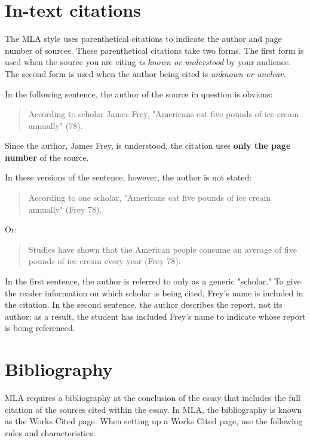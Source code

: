 \section{In-text citations}
The MLA style uses parenthetical citations to indicate the author and page number of 
sources. These parenthetical citations take two forms. The first form is used when the 
source you are citing \emph{is known or understood} by your audience. The second 
form is used when the author being cited is \emph{unknown or unclear}. 

In the following sentence, the author of the source in question is obvious:

\begin{quote}According to scholar James Frey, "Americans eat five pounds of ice cream 
annually" (78).
\end{quote}

Since the author, James Frey, is understood, the citation uses \textbf{only the page 
number} of the source.

In these versions of the sentence, however, the author is not stated:

\begin{quote}
According to one scholar, "Americans eat five pounds of ice cream annually" (Frey 78).
\end{quote}
Or:

\begin{quote}
Studies have shown that the American people consume an average of five pounds of ice 
cream every year (Frey 78).
\end{quote}
In the first sentence, the author is referred to only as a generic "scholar." To give the 
reader information on which scholar is being cited, Frey's name is included in the 
citation. In the second sentence, the author describes the report, not its author; as a 
result, the student has included Frey's name to indicate whose report is being referenced. 


\section{Bibliography}

MLA requires a bibliography at the conclusion of the essay that includes the full 
citation of the sources cited within the essay. In MLA, the bibliography is known as the 
Works Cited page. When setting up a Works Cited page, use the following rules and 
characteristics:


